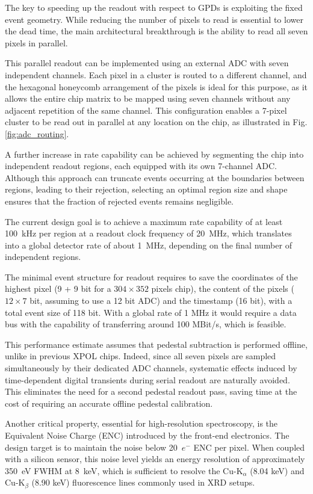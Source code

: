 The key to speeding up the readout with respect to GPDs is exploiting the fixed event geometry. While reducing the number of pixels to read is essential to lower the dead time, the main architectural breakthrough is the ability to read all seven pixels in parallel. 

This parallel readout can be implemented using an external ADC with seven independent channels. Each pixel in a cluster is routed to a different channel, and the hexagonal honeycomb arrangement of the pixels is ideal for this purpose, as it allows the entire chip matrix to be mapped using seven channels without any adjacent repetition of the same channel. This configuration enables a 7-pixel cluster to be read out in parallel at any location on the chip, as illustrated in Fig. \ref{fig:adc_routing}.

A further increase in rate capability can be achieved by segmenting the chip into independent readout regions, each equipped with its own 7-channel ADC. Although this approach can truncate events occurring at the boundaries between regions, leading to their rejection, selecting an optimal region size and shape ensures that the fraction of rejected events remains negligible.

The current design goal is to achieve a maximum rate capability of at least 100~kHz per region at a readout clock frequency of 20~MHz, which translates into a global detector rate of about 1~MHz, depending on the final number of independent regions.

The minimal event structure for readout requires to save the coordinates of the highest pixel (9 + 9 bit for a $304 \times 352$ pixels chip), the content of the pixels ($12 \times 7$ bit, assuming to use a 12 bit ADC) and the timestamp (16 bit), with a total event size of 118 bit. With a global rate of 1 MHz it would require a data bus with the capability of transferring around 100 MBit/s, which is feasible.

This performance estimate assumes that pedestal subtraction is performed offline, unlike in previous XPOL chips. Indeed, since all seven pixels are sampled simultaneously by their dedicated ADC channels, systematic effects induced by time-dependent digital transients during serial readout are naturally avoided. This eliminates the need for a second pedestal readout pass, saving time at the cost of requiring an accurate offline pedestal calibration.

Another critical property, essential for high-resolution spectroscopy, is the Equivalent Noise Charge (ENC) introduced by the front-end electronics. The design target is to maintain the noise below 20~$e^-$ ENC per pixel. When coupled with a silicon sensor, this noise level yields an energy resolution of approximately 350~eV FWHM at 8~keV, which is sufficient to resolve the Cu-K$_{\alpha}$ (8.04 keV) and Cu-K$_{\beta}$ (8.90 keV) fluorescence lines commonly used in XRD setups.

